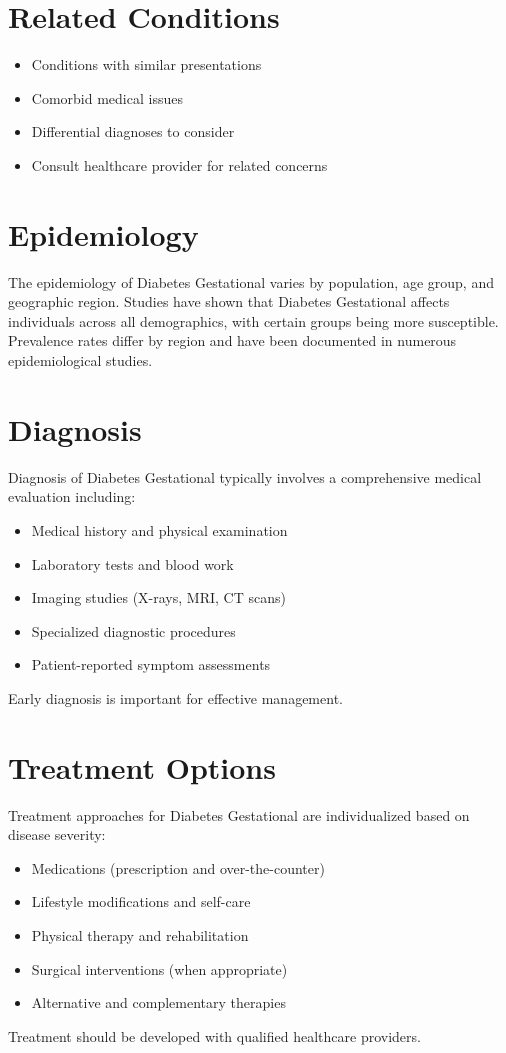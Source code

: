 \section*{Related Conditions}
\begin{itemize}
  \item Conditions with similar presentations
  \item Comorbid medical issues
  \item Differential diagnoses to consider
  \item Consult healthcare provider for related concerns
\end{itemize}

\section*{Epidemiology}
The epidemiology of Diabetes Gestational varies by population, age group, and geographic region. Studies have shown that Diabetes Gestational affects individuals across all demographics, with certain groups being more susceptible. Prevalence rates differ by region and have been documented in numerous epidemiological studies.

\section*{Diagnosis}
Diagnosis of Diabetes Gestational typically involves a comprehensive medical evaluation including:
\begin{itemize}
  \item Medical history and physical examination
  \item Laboratory tests and blood work
  \item Imaging studies (X-rays, MRI, CT scans)
  \item Specialized diagnostic procedures
  \item Patient-reported symptom assessments
\end{itemize}
Early diagnosis is important for effective management.

\section*{Treatment Options}
Treatment approaches for Diabetes Gestational are individualized based on disease severity:
\begin{itemize}
  \item Medications (prescription and over-the-counter)
  \item Lifestyle modifications and self-care
  \item Physical therapy and rehabilitation
  \item Surgical interventions (when appropriate)
  \item Alternative and complementary therapies
\end{itemize}
Treatment should be developed with qualified healthcare providers.

